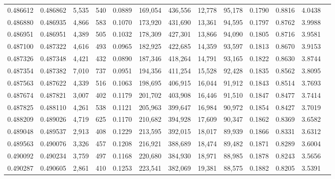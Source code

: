 \begin{tabular}{rrrrrrrrrrrrr}
0.486612 & 0.486862 & 5,535 &   540 &                                     0.0889 & 169,054 & 436,556 &  12,778 &  95,178 & 0.1790 & 0.8816 & 4.0438 \\
0.486880 & 0.486935 & 4,866 &   583 &                                     0.1070 & 173,920 & 431,690 &  13,361 &  94,595 & 0.1797 & 0.8762 & 3.9988 \\
0.486951 & 0.486951 & 4,389 &   505 &                                     0.1032 & 178,309 & 427,301 &  13,866 &  94,090 & 0.1805 & 0.8716 & 3.9581 \\
0.487100 & 0.487322 & 4,616 &   493 &                                     0.0965 & 182,925 & 422,685 &  14,359 &  93,597 & 0.1813 & 0.8670 & 3.9153 \\
0.487326 & 0.487348 & 4,421 &   432 &                                     0.0890 & 187,346 & 418,264 &  14,791 &  93,165 & 0.1822 & 0.8630 & 3.8744 \\
0.487354 & 0.487382 & 7,010 &   737 &                                     0.0951 & 194,356 & 411,254 &  15,528 &  92,428 & 0.1835 & 0.8562 & 3.8095 \\
0.487563 & 0.487622 & 4,339 &   516 &                                     0.1063 & 198,695 & 406,915 &  16,044 &  91,912 & 0.1843 & 0.8514 & 3.7693 \\
0.487674 & 0.487821 & 3,007 &   402 &                                     0.1179 & 201,702 & 403,908 &  16,446 &  91,510 & 0.1847 & 0.8477 & 3.7414 \\
0.487825 & 0.488110 & 4,261 &   538 &                                     0.1121 & 205,963 & 399,647 &  16,984 &  90,972 & 0.1854 & 0.8427 & 3.7019 \\
0.488209 & 0.489026 & 4,719 &   625 &                                     0.1170 & 210,682 & 394,928 &  17,609 &  90,347 & 0.1862 & 0.8369 & 3.6582 \\
0.489048 & 0.489537 & 2,913 &   408 &                                     0.1229 & 213,595 & 392,015 &  18,017 &  89,939 & 0.1866 & 0.8331 & 3.6312 \\
0.489563 & 0.490076 & 3,326 &   457 &                                     0.1208 & 216,921 & 388,689 &  18,474 &  89,482 & 0.1871 & 0.8289 & 3.6004 \\
0.490092 & 0.490234 & 3,759 &   497 &                                     0.1168 & 220,680 & 384,930 &  18,971 &  88,985 & 0.1878 & 0.8243 & 3.5656 \\
0.490287 & 0.490605 & 2,861 &   410 &                                     0.1253 & 223,541 & 382,069 &  19,381 &  88,575 & 0.1882 & 0.8205 & 3.5391 \\

\end{tabular}
